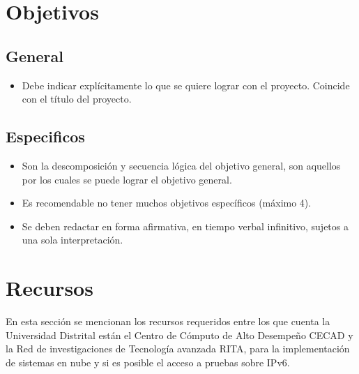 \documentclass[10pt]{article}   			%
\begin{document}
\newpage %

\section{Objetivos}

\subsection{General}

	\begin{itemize}
		\item Debe indicar explícitamente lo que se quiere lograr con el proyecto. Coincide con el título del proyecto.
	\end{itemize}
	
\subsection{Especificos}

	\begin{itemize}
		\item Son la descomposición y secuencia lógica del objetivo general, son aquellos por los cuales se puede lograr el objetivo general.
		\item Es recomendable no tener muchos objetivos específicos (máximo 4).
		\item Se deben redactar en forma afirmativa, en tiempo verbal infinitivo, sujetos a una sola interpretación.
	\end{itemize}
		
\section{Recursos}

En esta sección se mencionan los recursos requeridos entre los que cuenta la Universidad Distrital están el Centro de Cómputo de Alto Desempeño CECAD y la Red de investigaciones de Tecnología avanzada RITA, para la implementación de sistemas en nube y si es posible el acceso a pruebas sobre IPv6.
		
\end{document}
